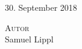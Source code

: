 \begin{titlepage}

\vfill


{\Large 30. September 2018}\\[1cm]
\begin{Large}
\textsc{Autor}\\Samuel Lippl
\end{Large}

\vfill

\end{titlepage}